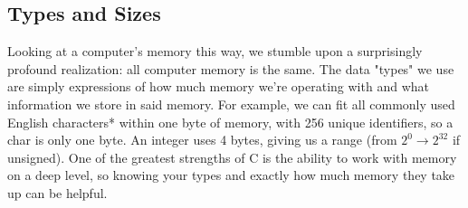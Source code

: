 \documentclass[a4paper, 12pt]{article}
\begin{document}
\subsection{Types and Sizes}

\begin{flushleft}
	Looking at a computer's memory this way, we stumble upon a surprisingly profound realization: all computer memory is the same.
	The data "types" we use are simply expressions of how much memory we're operating with and what information we store in said memory.
	For example, we can fit all commonly used English characters* within one byte of memory, with 256 unique identifiers, so a char is only one byte.
	An integer uses 4 bytes, giving us a range (from $2^0 \rightarrow 2^{32}$ if unsigned). One of the greatest strengths of C
	is the ability to work with memory on a deep level, so knowing your types and exactly how much memory they take up
	can be helpful.


\end{flushleft}
\end{document}
